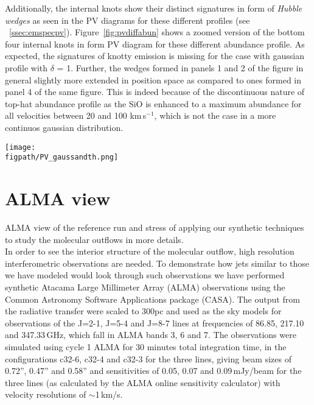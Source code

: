 \documentclass[useAMS,usenatbib,letters]{mn2e}
\newcommand{\figpath}{PFIGS/}
\begin{document}
Additionally, the internal knots show their distinct signatures in
form of {\em Hubble wedges} as seen in the PV diagrams for these
different profiles (see
~\ref{ssec:emspecpv}). Figure~\ref{fig:pvdiffabun} shows a zoomed
version of the bottom four internal knots in form PV diagram for these
different abundance profile. As expected, the signatures of knotty
emission is missing for the case with gaussian profile with $\delta$ =
1. Further, the wedges formed in panels 1 and 2 of the figure in
general slightly more extended in position space as compared to ones
formed in panel 4 of the same figure. This is indeed because of the
discontinuous nature of top-hat abundance profile as the SiO is
enhanced to a maximum abundance for all velocities between 20 and 100
km\,s$^{-1}$, which is not the case in a more continuos gaussian
distribution.

\begin{figure*}
 \texttt{[image: \\figpath/PV\_gaussandth.png]}
 \caption{Contour maps of position-velocity diagram for the internal
   knots for 2-$>$1 SiO emission for runs with molecular
   cooling having $\eta$ = 3 and $\beta$ = 10 and different abundance
   profiles. The contours mark different levels of emission in Kelvins, viz.,
   0.2,0.6,1.0,1.4,1.8,2.0,3.0,4.0.}
\label{fig:pvdiffabun}
\end{figure*}
   
 
\section{ALMA view}
ALMA view of the reference run and stress of applying our synthetic techniques
to study the molecular outflows in more details.\\

In order to see the interior structure of the molecular outflow, high resolution interferometric observations are needed. To demonstrate how jets similar to those we have modeled would look through such observations we have performed synthetic Atacama Large Millimeter Array (ALMA) observations using the Common Astronomy Software Applications package (CASA). The output from the radiative transfer were scaled to 300pc and used as the sky models for observations of the J=2-1, J=5-4 and J=8-7 lines at frequencies of 86.85, 217.10 and 347.33$\,$GHz, which fall in ALMA bands 3, 6 and 7. The observations were simulated using cycle 1 ALMA for 30 minutes total integration time, in the configurations c32-6, c32-4 and c32-3 for the three lines, giving beam sizes of 0.72'', 0.47'' and 0.58'' and sensitivities of 0.05, 0.07 and 0.09$\,$mJy/beam for the three lines (as calculated by the ALMA online sensitivity calculator) with velocity resolutions of $\sim$1$\,$km/s.
\end{document}
